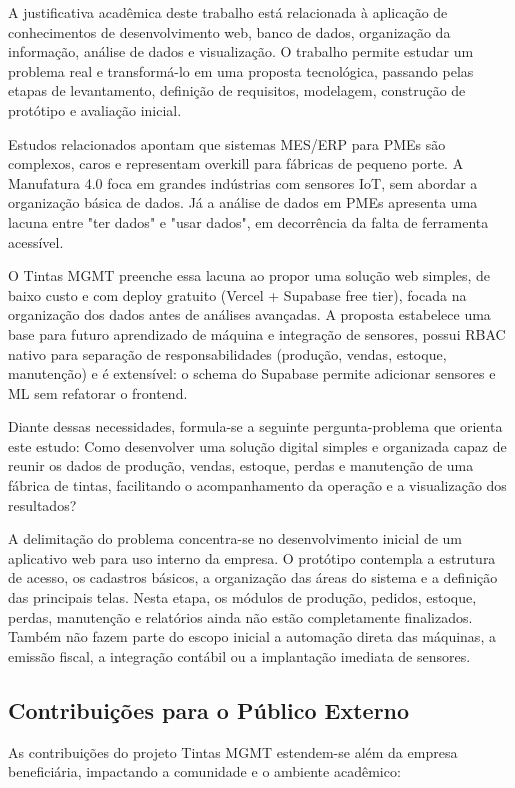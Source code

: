 \documentclass[12pt,a4paper]{article}
\begin{document}
A justificativa acadêmica deste trabalho está relacionada à aplicação de conhecimentos de desenvolvimento web, banco de dados, organização da informação, análise de dados e visualização. O trabalho permite estudar um problema real e transformá-lo em uma proposta tecnológica, passando pelas etapas de levantamento, definição de requisitos, modelagem, construção de protótipo e avaliação inicial.

Estudos relacionados apontam que sistemas MES/ERP para PMEs são complexos, caros e representam overkill para fábricas de pequeno porte. A Manufatura 4.0 foca em grandes indústrias com sensores IoT, sem abordar a organização básica de dados. Já a análise de dados em PMEs apresenta uma lacuna entre "ter dados" e "usar dados", em decorrência da falta de ferramenta acessível.

O Tintas MGMT preenche essa lacuna ao propor uma solução web simples, de baixo custo e com deploy gratuito (Vercel + Supabase free tier), focada na organização dos dados antes de análises avançadas. A proposta estabelece uma base para futuro aprendizado de máquina e integração de sensores, possui RBAC nativo para separação de responsabilidades (produção, vendas, estoque, manutenção) e é extensível: o schema do Supabase permite adicionar sensores e ML sem refatorar o frontend.

Diante dessas necessidades, formula-se a seguinte pergunta-problema que orienta este estudo: Como desenvolver uma solução digital simples e organizada capaz de reunir os dados de produção, vendas, estoque, perdas e manutenção de uma fábrica de tintas, facilitando o acompanhamento da operação e a visualização dos resultados?

A delimitação do problema concentra-se no desenvolvimento inicial de um aplicativo web para uso interno da empresa. O protótipo contempla a estrutura de acesso, os cadastros básicos, a organização das áreas do sistema e a definição das principais telas. Nesta etapa, os módulos de produção, pedidos, estoque, perdas, manutenção e relatórios ainda não estão completamente finalizados. Também não fazem parte do escopo inicial a automação direta das máquinas, a emissão fiscal, a integração contábil ou a implantação imediata de sensores.

\subsection{Contribuições para o Público Externo}
As contribuições do projeto Tintas MGMT estendem-se além da empresa beneficiária, impactando a comunidade e o ambiente acadêmico:
\end{document}
